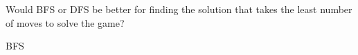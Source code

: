 \question Would BFS or DFS be better for finding the solution that takes the least number of moves to solve the game?
\begin{solution}[0.25in]
BFS
\end{solution}